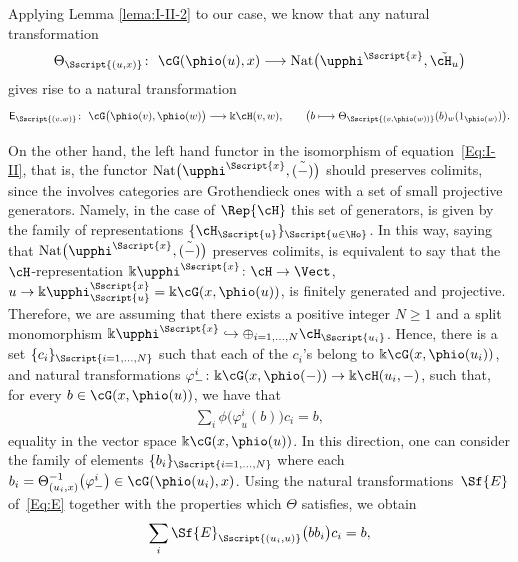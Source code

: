 Applying Lemma \ref{lema:I-II-2} to our case, we know that any natural transformation
\begin{gather*}
\Theta_{\Sscript{(u,x)}}\colon \ \cG(\phio(u),x) \longrightarrow {\rm Nat}\big( \upphi^{\Sscript{x}}, \tilde{\cH_{u}}\big)
\end{gather*}
gives rise to a natural transformation
\begin{gather}\label{Eq:E}
{\sf{E}}_{\Sscript{(v,w)}}\colon \ \cG\big(\phio(v),\phio(w)\big) \longrightarrow \Bbbk\cH(v,w), \qquad \big( b \longmapsto \Theta_{\Sscript{(v,\phio(w))}}(b){}_{w}(1_{\phio(w)}) \big).
\end{gather}

On the other hand, the left hand functor in the isomorphism of equation~\eqref{Eq:I-II}, that is, the functor ${\rm Nat}\big(\upphi^{\Sscript{x}}, \tilde{(-)}\big)$ should preserves colimits, since the involves categories are Grothendieck ones with a set of small projective generators. Namely, in the case of $\Rep{\cH}$ this set of generators, is given by the family of representations $\{ \cH_{\Sscript{u}}\}_{\Sscript{u \in \Ho}}$. In this way, saying that ${\rm Nat}\big(\upphi^{\Sscript{x}}, \tilde{(-)}\big)$ preserves colimits, is equivalent to say that the $\cH$-representation $\Bbbk \upphi^{\Sscript{x}}\colon \cH \to \Vect$, $u \to \Bbbk \upphi^{\Sscript{x}}_{\Sscript{u}}=\Bbbk\cG(x,\phio(u))$, is finitely generated and projective. Therefore, we are assuming that there exists a positive integer $N \geq 1$ and a split monomorphism $\Bbbk \upphi^{\Sscript{x}} \hookrightarrow \oplus_{i =1,\dots, N} \cH_{\Sscript{u_{i}}}$. Hence, there is a set $\{ c_{i}\}_{\Sscript{i =1,\dots, N}}$ such that each of the $c_{i}$'s belong to $\Bbbk \cG(x, \phio(u_{i}))$, and natural transformations $\varphi{}^{i}_{-}\colon \Bbbk \cG(x,\phio(-)) \to \Bbbk \cH(u_{i},-)$, such that, for every $b \in \cG(x,\phio(u))$, we have that
\begin{gather*}
\sum_{i} \phi\big( \varphi^{i}_{u}(b) \big) c_{i} = b,
\end{gather*}
equality in the vector space $ \Bbbk\cG(x,\phio(u))$. In this direction, one can consider the family of elements $\{b_{i}\}_{\Sscript{i= 1,\dots, N}}$ where each $b_{i} = \Theta_{(u_{i}, x)}^{-1}\big( \varphi^{i}_{-}\big) \in \cG(\phio(u_{i}),x)$. Using the natural transformations~$\Sf{E}$ of~\eqref{Eq:E} together with the properties which $\Theta$ satisfies, we obtain
\begin{gather*}
\sum_{i} \Sf{E}_{\Sscript{(u_{i}, u)}} \big( bb_{i}\big) c_{i} = b,
\end{gather*}
